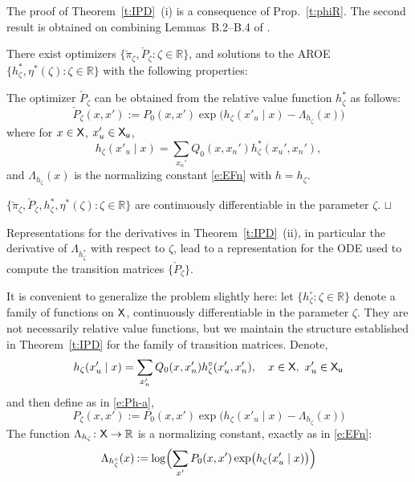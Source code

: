 \documentclass[final,12pt]{colt2018} %
\def\EFn#1{\Lambda_{#1}}
\def\sq{\hbox{\rlap{$\sqcap$}$\sqcup$}}
\def\qed{\ifmmode\sq\else{\unskip\nobreak\hfil
\penalty50\hskip1em\null\nobreak\hfil\sq
\parfillskip=0pt\finalhyphendemerits=0\endgraf}\fi\medskip}
\def\state{{\sf X}}
\def\stateu{{\sf X}_{\sf u}}
\newcommand{\field}[1]{\mathbb{#1}}
\def\Re{\field{R}}
\def\cpi{\check{\pi}}
\def\cP{{\check{P}}}
\def\eqdef{\mathbin{:=}}
\def\Prop#1{Prop.~\ref{#1}}
\def\Theorem#1{Theorem~\ref{#1}}
\newcounter{rmnumx}
\newenvironment{romannumx}{\begin{list}{{\upshape (\roman{rmnumx})}}{\usecounter{rmnumx}
\setlength{\leftmargin}{2pt}
\setlength{\rightmargin}{4pt}
\setlength{\itemsep}{3pt}
\setlength{\itemindent}{18pt}
}}{\end{list}}
\def\Re{\field{R}}
\begin{document}
   The proof of \Theorem{t:IPD}~(i) is a consequence of \Prop{t:phiR}.  The second result is obtained on combining   Lemmas~B.2--B.4 of   \cite{busmey18a}.
\begin{theorem}
\label{t:IPD}
There exist optimizers $\{\cpi_\zeta, \cP_\zeta : \zeta\in\Re\}$,  and solutions to
the AROE    $\{h^*_\zeta,\eta^*(\zeta): \zeta\in\Re\}$ with the following properties: 
\begin{romannumx}


\item  
The optimizer $\cP_\zeta$ can be obtained from the relative value function $h^*_\zeta$ as follows:  
\begin{equation}
\cP_\zeta(x,x')
\eqdef P_0(x,x')\exp\bigl(  h_\zeta(x'_u\mid  x)  -  \EFn{h_\zeta}(x)    \bigr)
\label{e:Pzeta-a}
\end{equation}
where  for $ 
x\in\state$, $x_u'\in\stateu$,
\begin{equation}
 h_\zeta(x'_u\mid  x)  =  \sum_{x_n'} Q_0(x,x_n') h^*_\zeta(x_u',x_n'),  
\label{e:hmidzeta}
\end{equation}
and $\EFn{h_\zeta}(x) $ is the normalizing constant \eqref{e:EFn} with   $h=h_\zeta$. 
 

\item
$\{\cpi_\zeta, \cP_\zeta, h^*_\zeta,\eta^*(\zeta): \zeta\in\Re\}$ are continuously differentiable in the parameter $\zeta$.
\qed
\end{romannumx}
\end{theorem}
 

Representations for the derivatives in \Theorem{t:IPD}~(ii),  in particular the derivative of $\EFn{h_\zeta^*}$ with respect to $\zeta$,  lead to a representation for the ODE   used to compute the    transition matrices $\{\cP_\zeta\}$. 

 
 

 
It is convenient to generalize the problem slightly here:  let $\{h_\zeta^\circ : \zeta\in\Re\}$ denote a family of functions on $\state$, continuously differentiable in the parameter $\zeta$.  They are not necessarily relative value functions, but we maintain the structure established in  \Theorem{t:IPD} for the  family of transition matrices.  Denote,
\begin{equation}
h_\zeta (x'_u\mid  x)   =  \sum_{x_n'} Q_0(x,x_n') h^\circ_\zeta(x_u',x_n'),  
\quad 
x\in\state,\ x_u'\in\stateu
\label{e:hmidcirc}
\end{equation}
and then define as in \eqref{e:Ph-a},
\begin{equation}
 P_\zeta(x,x')
\eqdef P_0(x,x')\exp\bigl(  h_\zeta(x'_u\mid  x )  -  \EFn{h_\zeta}(x)    \bigr)
\label{e:Pzeta}
\end{equation} 
The function   $\EFn{h_\zeta}\colon\state\to\Re$ is a normalizing constant, exactly as in \eqref{e:EFn}:
\[
    \EFn{h_\zeta^\circ}(x)     
\eqdef  \log\Bigl( \sum_{x'} P_0(x,x')\exp\bigl(  h_\zeta(x'_u\mid  x)     \bigr) \Bigr)
\]
\end{document}
